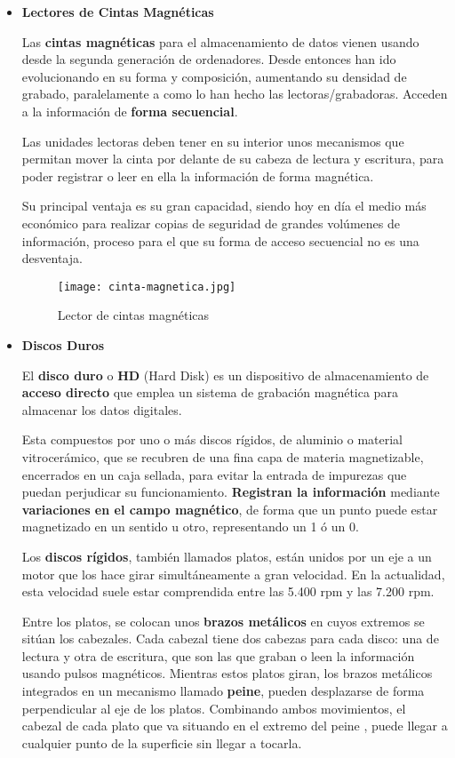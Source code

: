 \begin{itemize}
    \item \textbf{Lectores de Cintas Magnéticas}

    Las \textbf{cintas magnéticas} para el almacenamiento de datos vienen usando desde la segunda generación de ordenadores. Desde entonces han ido evolucionando en su forma y composición, aumentando su densidad de grabado, paralelamente a como lo han hecho las lectoras/grabadoras. Acceden a la información de \textbf{forma secuencial}.

    Las unidades lectoras deben tener en su interior unos mecanismos que permitan mover la cinta por delante de su cabeza de lectura y escritura, para poder registrar o leer en ella la información de forma magnética.

    Su principal ventaja es su gran capacidad, siendo hoy en día el medio más económico para realizar copias de seguridad de grandes volúmenes de información, proceso para el que su forma de acceso secuencial no es una desventaja.

    \begin{figure}[ht]
        \centering
        \texttt{[image: cinta-magnetica.jpg]}
        \caption{Lector de cintas magnéticas}
    \end{figure}

    \item \textbf{Discos Duros}

    El \textbf{disco duro} o \textbf{HD} (Hard Disk) es un dispositivo de almacenamiento de \textbf{acceso directo} que emplea un sistema de grabación magnética para almacenar los datos digitales.

    Esta compuestos por uno o más discos rígidos, de aluminio o material vitrocerámico, que se recubren de una fina capa de materia magnetizable, encerrados en un caja sellada, para evitar la entrada de impurezas que puedan perjudicar su funcionamiento. \textbf{Registran la información} mediante \textbf{variaciones en el campo magnético}, de forma que un punto puede estar magnetizado en un sentido u otro, representando un 1 ó un 0.

    Los \textbf{discos rígidos}, también llamados platos, están unidos por un eje a un motor que los hace girar simultáneamente a gran velocidad. En la actualidad, esta velocidad suele estar comprendida entre las 5.400 rpm y las 7.200 rpm.

    Entre los platos, se colocan unos \textbf{brazos metálicos} en cuyos extremos se sitúan los cabezales. Cada cabezal tiene dos cabezas para cada disco: una de lectura y otra de escritura, que son las que graban o leen la información usando pulsos magnéticos. Mientras estos platos giran, los brazos metálicos integrados en un mecanismo llamado \textbf{peine}, pueden desplazarse de forma perpendicular al eje de los platos. Combinando ambos movimientos, el cabezal de cada plato que va situando en el extremo del peine , puede llegar a cualquier punto de la superficie sin llegar a tocarla.


\end{itemize}

